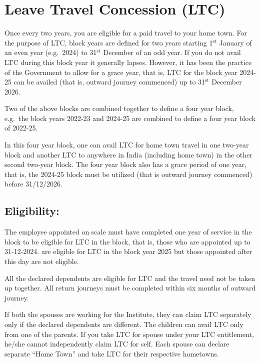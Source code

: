 \documentclass[
  10pt,
  a5paper,
  10pt,
  openany]{amsbook}
\begin{document}
\section{Leave Travel Concession
(LTC)}\label{leave-travel-concession-ltc}

Once every two years, you are eligible for a paid travel to your home
town. For the purpose of LTC, block years are defined for two years
starting 1\(^{\text{st}}\) January of an even year (e.g.~2024) to
31\(^{\text{st}}\) December of an odd year. If you do not avail LTC
during this block year it generally lapses. However, it has been the
practice of the Government to allow for a grace year, that is, LTC for
the block year 2024-25 can be availed (that is, outward journey
commenced) up to 31\(^{\text{st}}\) December 2026.

Two of the above blocks are combined together to define a four year
block, e.g.~the block years 2022-23 and 2024-25 are combined to define a
four year block of 2022-25.

In this four year block, one can avail LTC for home town travel in one
two-year block and another LTC to anywhere in India (including home
town) in the other second two-year block. The four year block also has a
grace period of one year, that is, the 2024-25 block must be utilized
(that is outward journey commenced) before 31/12/2026.

\subsection{Eligibility:}\label{eligibility}

The employee appointed on scale must have completed one year of service
in the block to be eligible for LTC in the block, that is, those who are
appointed up to 31-12-2024. are eligible for LTC in the block year 2025
but those appointed after this day are not eligible.

All the declared dependents are eligible for LTC and the travel need not
be taken up together. All return journeys must be completed within six
months of outward journey.

If both the spouses are working for the Institute, they can claim LTC
separately only if the declared dependents are different. The children
can avail LTC only from one of the parents. If you take LTC for spouse
under your LTC entitlement, he/she cannot independently claim LTC for
self. Each spouse can declare separate ``Home Town'' and take LTC for
their respective hometowns.
\end{document}
